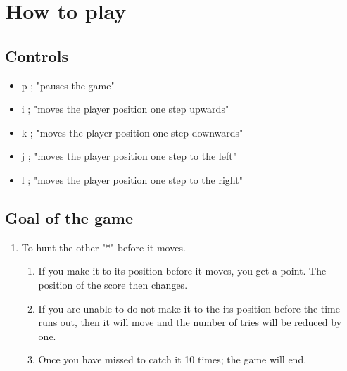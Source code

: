 \section{How to play}%
\label{sec:how_to_play}

\subsection{Controls}%
\label{sub:controls}
\begin{itemize}
    \item p ; "pauses the game"
    \item i ; "moves the player position one step upwards"
    \item k ; "moves the player position one step downwards"
    \item j ; "moves the player position one step to the left"
    \item l ; "moves the player position one step to the right"
\end{itemize}

\subsection{Goal of the game}%
\label{sub:goal_of_the_game}
\begin{enumerate}
    \item To hunt the other "*" before it moves.
        \begin{enumerate}
            \item If you make it to its position before it moves, you get a point. The position of the score then changes.
            \item If you are unable to do not make it to the its position before the time runs out, then it will move and the number of tries will be reduced by one.
            \item Once you have missed to catch it 10 times; the game will end.
        \end{enumerate}
\end{enumerate}
